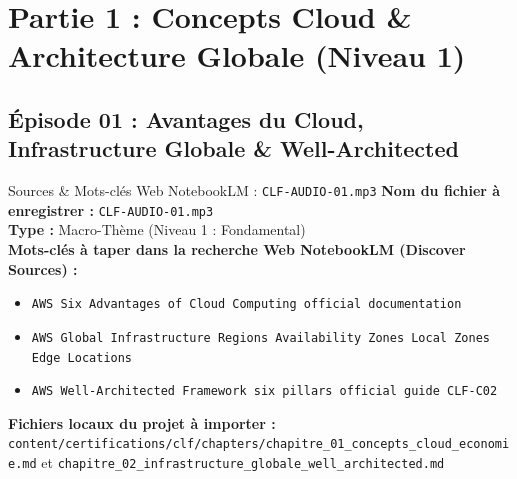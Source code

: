 \documentclass[11pt,a4paper]{article}
\begin{document}
\section{Partie 1 : Concepts Cloud \& Architecture Globale (Niveau 1)}

\subsection{Épisode 01 : Avantages du Cloud, Infrastructure Globale \& Well-Architected}
\begin{sourcebox}{Sources \& Mots-clés Web NotebookLM : \texttt{CLF-AUDIO-01.mp3}}
\textbf{Nom du fichier à enregistrer :} \texttt{CLF-AUDIO-01.mp3}\\
\textbf{Type :} Macro-Thème (Niveau 1 : Fondamental)\\
\textbf{Mots-clés à taper dans la recherche Web NotebookLM (Discover Sources) :}
\begin{itemize}[noitemsep]
    \item \texttt{AWS Six Advantages of Cloud Computing official documentation}
    \item \texttt{AWS Global Infrastructure Regions Availability Zones Local Zones Edge Locations}
    \item \texttt{AWS Well-Architected Framework six pillars official guide CLF-C02}
\end{itemize}
\textbf{Fichiers locaux du projet à importer :}
\texttt{content/certifications/clf/chapters/chapitre_01_concepts_cloud_economie.md} et \texttt{chapitre_02_infrastructure_globale_well_architected.md}
\end{sourcebox}
\end{document}
